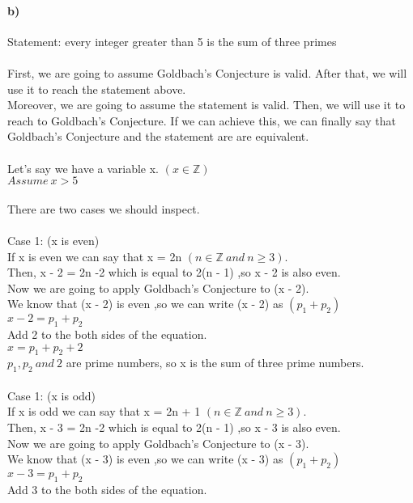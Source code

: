 \documentclass[12pt]{article}
\begin{document}
\paragraph{b)}
Statement: every integer greater than 5 is the sum of three primes\\
\\
{First, we are going to assume Goldbach's Conjecture is valid.}
{After that, we will use it to reach the statement above.}\\
{Moreover, we are going to assume the statement is valid.}
{Then, we will use it to reach to Goldbach's Conjecture.}
{If we can achieve this, we can finally say that}
{Goldbach's Conjecture and the statement are}
{are equivalent.}\\
\\
Let's say we have a variable x. $(x \in \mathbb{Z})$\\
$Assume\ x > 5$\\
\\
There are two cases we should inspect.\\
\\
Case 1: (x is even)\\
If x is even we can say that x = 2n $(n \in \mathbb{Z}\ and\ n \geq 3)$. \\
Then, x - 2 = 2n -2 which is equal to 2(n - 1) ,so x - 2 is also even. \\
Now we are going to apply Goldbach's Conjecture to (x - 2).\\
We know that (x - 2) is even ,so we can write (x - 2) as $(p_1 + p_2)$  \\
$x - 2 = p_1 + p_2$\\
Add 2 to the both sides of the equation.\\
$x = p_1 + p_2 + 2$\\
$p_1, p_2\ and\ 2$ are prime numbers, so x is the sum of three prime numbers.\\
\\
Case 1: (x is odd)\\
If x is odd we can say that x = 2n + 1 $(n \in \mathbb{Z}\ and\ n \geq 3)$. \\
Then, x - 3 = 2n -2 which is equal to 2(n - 1) ,so x - 3 is also even. \\
Now we are going to apply Goldbach's Conjecture to (x - 3).\\
We know that (x - 3) is even ,so we can write (x - 3) as $(p_1 + p_2)$  \\
$x - 3 = p_1 + p_2$\\
Add 3 to the both sides of the equation.\\
\end{document}
